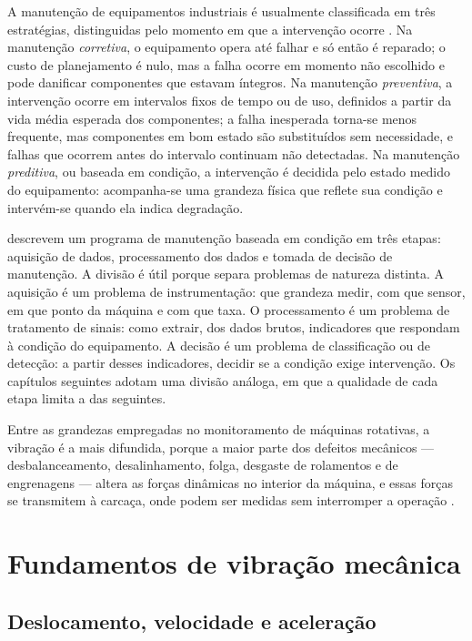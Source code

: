 A manutenção de equipamentos industriais é usualmente classificada em três estratégias,
distinguidas pelo momento em que a intervenção ocorre \cite{mobley2002}. Na manutenção
\emph{corretiva}, o equipamento opera até falhar e só então é reparado; o custo de
planejamento é nulo, mas a falha ocorre em momento não escolhido e pode danificar
componentes que estavam íntegros. Na manutenção \emph{preventiva}, a intervenção ocorre em
intervalos fixos de tempo ou de uso, definidos a partir da vida média esperada dos
componentes; a falha inesperada torna-se menos frequente, mas componentes em bom estado são
substituídos sem necessidade, e falhas que ocorrem antes do intervalo continuam não
detectadas. Na manutenção \emph{preditiva}, ou baseada em condição, a intervenção é decidida
pelo estado medido do equipamento: acompanha-se uma grandeza física que reflete sua
condição e intervém-se quando ela indica degradação.

 descrevem um programa de manutenção baseada em condição em três
etapas: aquisição de dados, processamento dos dados e tomada de decisão de manutenção. A
divisão é útil porque separa problemas de natureza distinta. A aquisição é um problema de
instrumentação: que grandeza medir, com que sensor, em que ponto da máquina e com que taxa.
O processamento é um problema de tratamento de sinais: como extrair, dos dados brutos,
indicadores que respondam à condição do equipamento. A decisão é um problema de
classificação ou de detecção: a partir desses indicadores, decidir se a condição exige
intervenção. Os capítulos seguintes adotam uma divisão análoga, em que a qualidade de cada
etapa limita a das seguintes.

Entre as grandezas empregadas no monitoramento de máquinas rotativas, a vibração é a mais
difundida, porque a maior parte dos defeitos mecânicos --- desbalanceamento, desalinhamento,
folga, desgaste de rolamentos e de engrenagens --- altera as forças dinâmicas no interior da
máquina, e essas forças se transmitem à carcaça, onde podem ser medidas sem interromper a
operação \cite{randall2011livro}.

\section{Fundamentos de vibração mecânica}
\label{sec:fund-vibracao}

\subsection{Deslocamento, velocidade e aceleração}


